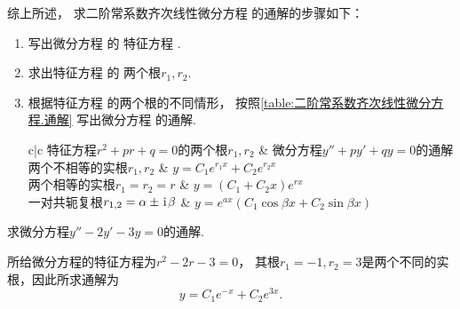 综上所述，
求二阶常系数齐次线性微分方程  的通解的步骤如下：
\begin{algorithm}[求解二阶常系数齐次线性微分方程]
\hfill
\begin{enumerate}
	\item
	写出微分方程  的
	特征方程 .

	\item
	求出特征方程  的
	两个根\(r_1,r_2\).

	\item
	根据特征方程  的两个根的不同情形，
	按照\cref{table:二阶常系数齐次线性微分方程.通解}
	写出微分方程  的通解.
	\begin{table}[htb]
		\centering
		\begin{tblr}{c|c}
			\hline
			特征方程\(r^2+pr+q=0\)的两个根\(r_1,r_2\)
				& 微分方程\(y''+py'+qy = 0\)的通解 \\ \hline
			两个不相等的实根\(r_1,r_2\)
				& \(y = C_1 e^{r_1 x} + C_2 e^{r_2 x}\) \\
			两个相等的实根\(r_1=r_2=r\)
				& \(y = (C_1 + C_2 x) e^{r x}\) \\
			一对共轭复根\(r_{1,2}=\alpha\pm\kern1pt\mathrm{i}\kern1pt\beta\)
				& \(y = e^{ax} (C_1 \cos{\beta x} + C_2 \sin{\beta x})\) \\ \hline
		\end{tblr}
		\caption{}
		\label{table:二阶常系数齐次线性微分方程.通解}
	\end{table}
\end{enumerate}
\end{algorithm}
\begin{example}
求微分方程\(y'' - 2y' - 3y = 0\)的通解.
\begin{solution}
所给微分方程的特征方程为\(r^2-2r-3=0\)，
其根\(r_1=-1, r_2=3\)是两个不同的实根，因此所求通解为\begin{equation*}
	y = C_1 e^{-x} + C_2 e^{3x}.
\end{equation*}
\end{solution}
\end{example}

